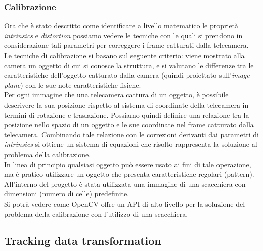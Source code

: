 \subsubsection{Calibrazione}

Ora che è stato descritto come identificare a livello matematico le proprietà \textit{intrinsics} e \textit{distortion} possiamo vedere le tecniche con le quali si prendono in considerazione tali parametri per correggere i frame catturati dalla telecamera.\\
Le tecniche di calibrazione si basano sul seguente criterio: viene mostrato alla camera un oggetto di cui si conosce la struttura, e si valutano le differenze tra le caratteristiche dell'oggetto catturato dalla camera (quindi proiettato sull'\textit{image plane}) con le sue note caratteristiche fisiche. \\Per ogni immagine che una telecamera cattura di un oggetto, è possibile descrivere la sua posizione rispetto al sistema di coordinate della telecamera in termini di rotazione e traslazione. Possiamo quindi definire una relazione tra la posizione nello spazio di un oggetto e le sue coordinate nel frame catturato dalla telecamera. Combinando tale relazione con le correzioni derivanti dai parametri di \textit{intrinsics} si ottiene un sistema di equazioni che risolto rappresenta la soluzione al problema della calibrazione.\\
In linea di principio qualsiasi oggetto può essere usato ai fini di tale operazione, ma è pratico utilizzare un oggetto che presenta caratteristiche regolari (pattern). All'interno del progetto è stata  utilizzata una immagine di una scacchiera con dimensioni (numero di celle) predefinite.  \\
Si potrà vedere come OpenCV offre un API di alto livello per la soluzione del problema della calibrazione con l'utilizzo di una scacchiera.

\subsection{Tracking data transformation}

